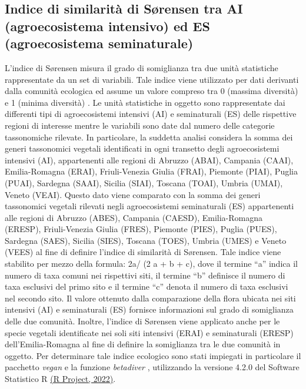 \documentclass[main.tex]{subfiles}
\begin{document}
\subsection{Indice di similarità di Sørensen tra AI (agroecosistema intensivo) ed ES (agroecosistema seminaturale)}\label{Cap. 2.8}

L'indice di Sørensen misura il grado di somiglianza tra due unità statistiche rappresentate da un set di variabili. Tale indice viene utilizzato per dati derivanti dalla comunità ecologica ed assume un valore compreso tra 0 (massima diversità) e 1 (minima diversità) \citep{biondi}.
Le unità statistiche in oggetto sono rappresentate dai differenti tipi di agroecosistemi intensivi (AI) e seminaturali (ES) delle rispettive regioni di interesse mentre le variabili sono date dal numero delle categorie tassonomiche rilevate.
In particolare, la suddetta analisi considera la somma dei generi tassonomici vegetali identificati in ogni transetto degli agroecosistemi intensivi (AI), appartenenti alle regioni di Abruzzo (ABAI), Campania (CAAI), Emilia-Romagna (ERAI), Friuli-Venezia Giulia (FRAI), Piemonte (PIAI), Puglia (PUAI), Sardegna (SAAI), Sicilia (SIAI), Toscana (TOAI), Umbria (UMAI), Veneto (VEAI). Questo dato viene comparato con la somma dei generi tassonomici vegetali rilevati negli agroecosistemi seminaturali (ES) appartenenti alle regioni di Abruzzo (ABES), Campania (CAESD), Emilia-Romagna (ERESP), Friuli-Venezia Giulia (FRES), Piemonte (PIES), Puglia (PUES), Sardegna (SAES), Sicilia (SIES), Toscana (TOES), Umbria (UMES) e Veneto (VEES) al fine di definire l’indice di similarità di Sørensen. Tale indice viene stabilito per mezzo della formula: 2a/ (2 a + b + c), dove il termine “a” indica il numero di taxa comuni nei rispettivi siti, il termine “b” definisce il numero di taxa esclusivi del primo sito e il termine “c” denota il numero di taxa esclusivi nel secondo sito. Il valore ottenuto dalla comparazione della flora ubicata nei siti intensivi (AI) e seminaturali (ES) fornisce informazioni sul grado di somiglianza delle due comunità.
Inoltre, l’indice di Sørensen viene applicato anche per le specie vegetali identificate nei soli siti intensivi (ERAI) e seminaturali (ERESP) dell’Emilia-Romagna al fine di definire la somiglianza tra le due comunità in oggetto.
Per determinare tale indice ecologico sono stati impiegati in particolare il pacchetto \textit{vegan} \citep{oks} e la funzione \textit{betadiver} \citep{mario}, utilizzando la versione 4.2.0 del Software Statistico R \href{https://www.r-project.org/}{(R Project, 2022)}.
\end{document}
